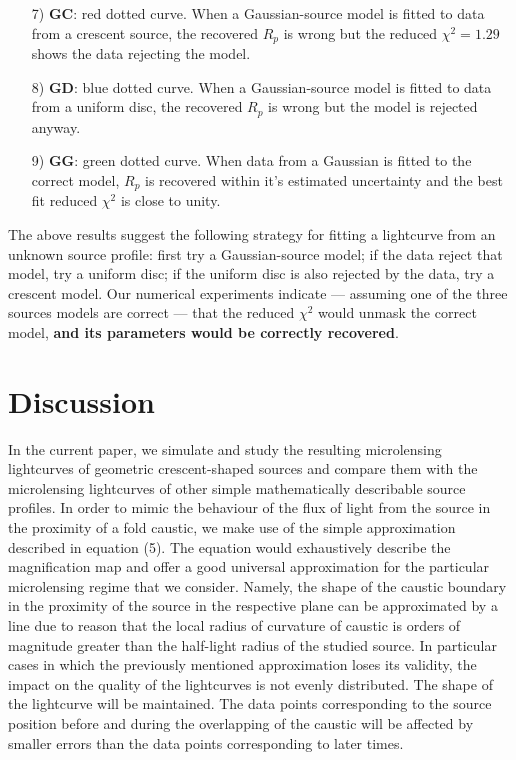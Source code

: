 \documentclass[usenatbib]{mn2e}
\begin{document}
\begin{enumerate}

\item[7) {\bf GC}:] red dotted curve.  When a Gaussian-source model is
  fitted to data from a crescent source, the recovered $R_p$ is wrong
  but the reduced $\chi^2=1.29$ shows the data rejecting the model.

\item[8) {\bf GD}:] blue dotted curve.  When a Gaussian-source model
  is fitted to data from a uniform disc, the recovered $R_p$ is wrong
  but the model is rejected anyway.

\item[9) {\bf GG}:] green dotted curve.  When data from a Gaussian is
  fitted to the correct model, $R_p$ is recovered within it's estimated
  uncertainty and the best fit reduced $\chi^2$ is close to unity.

\end{enumerate}

The above results suggest the following strategy for fitting a
lightcurve from an unknown source profile: first try a Gaussian-source
model; if the data reject that model, try a uniform disc; if the
uniform disc is also rejected by the data, try a crescent model.  Our
numerical experiments indicate --- assuming one of the three sources
models are correct --- that the reduced $\chi^2$ would unmask the
correct model, \textbf{and its parameters would be correctly recovered}.

\section{Discussion}\label{sec:discussion}

In the current paper, we simulate and study the resulting microlensing lightcurves of geometric crescent-shaped sources 
and compare them with the microlensing lightcurves of other simple mathematically describable source profiles. 
In order to mimic the behaviour of the flux of light from the source in the proximity of a fold caustic, we make use of the simple approximation described in equation (5). 
The equation would exhaustively describe the magnification map and offer a good universal approximation for the 
particular microlensing regime that we consider. 
Namely, the shape of the caustic boundary in the proximity of the source in the respective plane can be approximated by
 a line due to reason that the local radius of curvature of caustic is orders of magnitude greater than the half-light
 radius of the studied source. 
In particular cases in which the previously mentioned approximation loses its validity, the impact on the quality of the 
lightcurves is not evenly distributed. The shape of the lightcurve will be maintained. 
The data points corresponding to the source position before and during the overlapping of the caustic will be affected by
 smaller errors than the data points corresponding to later times. \\
\end{document}
